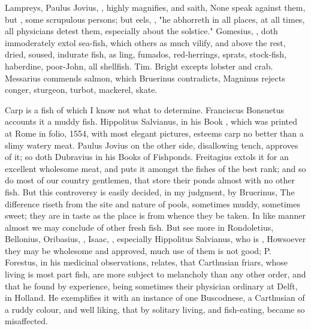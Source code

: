 Lampreys, Paulus Jovius, ,
highly magnifies, and saith, None speak against them, but , some scrupulous persons; but eels,
, "he abhorreth in all places, at all times, all
physicians detest them, especially about the solstice." Gomesius,
, doth immoderately extol
sea-fish, which others as much vilify, and above the rest, dried, soused,
indurate fish, as ling, fumados, red-herrings, sprats, stock-fish, haberdine,
poor-John, all shellfish. Tim. Bright excepts lobster and
crab. Messarius commends salmon, which Bruerinus contradicts,
 Magninus rejects conger, sturgeon,
turbot, mackerel, skate.

Carp is a fish of which I know not what to determine. Franciscus Bonsuetus
accounts it a muddy fish. Hippolitus Salvianus, in his Book
, which was printed at
Rome in folio, 1554, with most elegant pictures, esteems carp no better than a
slimy watery meat. Paulus Jovius on the other side, disallowing tench, approves
of it; so doth Dubravius in his Books of Fishponds. Freitagius
extols it for an excellent wholesome meat, and puts it
amongst the fishes of the best rank; and so do most of our country gentlemen,
that store their ponds almost with no other fish. But this controversy is
easily decided, in my judgment, by Bruerinus,  The difference riseth from the site and nature of pools,
sometimes muddy, sometimes sweet; they are in taste as the
place is from whence they be taken. In like manner almost we may conclude of
other fresh fish. But see more in Rondoletius, Bellonius, Oribasius,
, Isaac, ,
especially Hippolitus Salvianus, who is , \etc{}
Howsoever they may be wholesome and approved, much use of them is not good; P.
Forestus, in his medicinal observations, relates, that
Carthusian friars, whose living is most part fish, are more subject to
melancholy than any other order, and that he found by experience, being
sometimes their physician ordinary at Delft, in Holland. He exemplifies it with
an instance of one Buscodnese, a Carthusian of a ruddy colour, and well liking,
that by solitary living, and fish-eating, became so misaffected.

